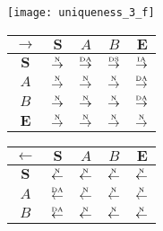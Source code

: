 \begin{figure}[htbp]
  \begin{subfigure}{1\textwidth}
    \vspace{1em}
    \centering
    \begin{minipage}[b]{1\textwidth}
      \centering
      \texttt{[image: uniqueness\_3\_f]}
    \end{minipage}
    \begin{minipage}[b]{0.3\textwidth}
      \vspace{1em}
      \centering
      \begin{tabular}{|c|c|c|c|c|} \hline
        $\rightarrow$ & $\bm{S}$ & $A$ & $B$ & $\bm{E}$\\ \hline
        $\bm{S}$ & $\overset{\text{\tiny{N}}}{\rightarrow}$ & $\overset{\text{\tiny{DA}}}{\rightarrow}$ & $\overset{\text{\tiny{DS}}}{\rightarrow}$ & $\overset{\text{\tiny{IA}}}{\rightarrow}$\\ \hline
        $A$ & $\overset{\text{\tiny{N}}}{\rightarrow}$ & $\overset{\text{\tiny{N}}}{\rightarrow}$ & $\overset{\text{\tiny{N}}}{\rightarrow}$ & $\overset{\text{\tiny{DA}}}{\rightarrow}$\\ \hline
        $B$ & $\overset{\text{\tiny{N}}}{\rightarrow}$ & $\overset{\text{\tiny{N}}}{\rightarrow}$ & $\overset{\text{\tiny{N}}}{\rightarrow}$ & $\overset{\text{\tiny{DA}}}{\rightarrow}$\\ \hline
        $\bm{E}$ & $\overset{\text{\tiny{N}}}{\rightarrow}$ & $\overset{\text{\tiny{N}}}{\rightarrow}$ & $\overset{\text{\tiny{N}}}{\rightarrow}$ & $\overset{\text{\tiny{N}}}{\rightarrow}$\\ \hline
      \end{tabular}
    \end{minipage}
    \begin{minipage}[b]{0.3\textwidth}
      \vspace{1em}
      \centering
      \begin{tabular}{|c|c|c|c|c|} \hline
        $\leftarrow$ & $\bm{S}$ & $A$ & $B$ & $\bm{E}$\\ \hline
        $\bm{S}$ & $\overset{\text{\tiny{N}}}{\leftarrow}$ & $\overset{\text{\tiny{N}}}{\leftarrow}$ & $\overset{\text{\tiny{N}}}{\leftarrow}$ & $\overset{\text{\tiny{N}}}{\leftarrow}$\\ \hline
        $A$ & $\overset{\text{\tiny{DA}}}{\leftarrow}$ & $\overset{\text{\tiny{N}}}{\leftarrow}$ & $\overset{\text{\tiny{N}}}{\leftarrow}$ & $\overset{\text{\tiny{N}}}{\leftarrow}$\\ \hline
        $B$ & $\overset{\text{\tiny{DA}}}{\leftarrow}$ & $\overset{\text{\tiny{N}}}{\leftarrow}$ & $\overset{\text{\tiny{N}}}{\leftarrow}$ & $\overset{\text{\tiny{N}}}{\leftarrow}$\\ \hline

\end{tabular}
\end{minipage}
\end{subfigure}
\end{figure}
